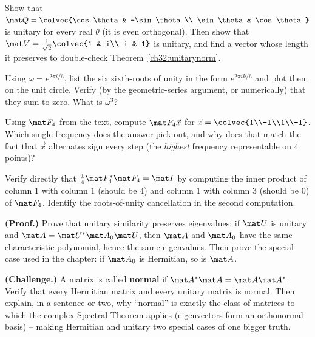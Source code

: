 \begin{exercise}\label{ch32:ex-unitarycheck}
Show that $\mat Q=\colvec{\cos\theta & -\sin\theta\\ \sin\theta & \cos\theta}$ is
unitary for every real $\theta$ (it is even orthogonal). Then show that
$\mat V=\tfrac1{\sqrt2}\colvec{1 & i\\ i & 1}$ is unitary, and find a vector whose
length it preserves to double-check Theorem~\ref{ch32:unitarynorm}.
\end{exercise}

\begin{exercise}\label{ch32:ex-rootsum}
Using $\omega=e^{2\pi i/6}$, list the six sixth-roots of unity in the form
$e^{2\pi ik/6}$ and plot them on the unit circle. Verify (by the geometric-series
argument, or numerically) that they sum to zero. What is $\omega^3$?
\end{exercise}

\begin{exercise}\label{ch32:ex-f4}
Using $\mat F_4$ from the text, compute $\mat F_4\vec x$ for
$\vec x=\colvec{1\\-1\\1\\-1}$. Which single frequency does the answer pick out, and
why does that match the fact that $\vec x$ alternates sign every step (the
\emph{highest} frequency representable on $4$ points)?
\end{exercise}

\begin{exercise}\label{ch32:ex-f4unitary}
Verify directly that $\tfrac14\mat F_4^{*}\mat F_4=\mat I$ by computing the inner
product of column $1$ with column $1$ (should be $4$) and column $1$ with column $3$
(should be $0$) of $\mat F_4$. Identify the roots-of-unity cancellation in the
second computation.
\end{exercise}

\begin{exercise}\label{ch32:ex-unitarysim}
\textbf{(Proof.)} Prove that unitary similarity preserves eigenvalues: if $\mat U$
is unitary and $\mat A=\mat U^{*}\mat A_0\mat U$, then $\mat A$ and $\mat A_0$ have
the same characteristic polynomial, hence the same eigenvalues. Then prove the
special case used in the chapter: if $\mat A_0$ is Hermitian, so is $\mat A$.
\end{exercise}

\begin{exercise}\label{ch32:ex-normalproof}
\textbf{(Challenge.)} A matrix is called \textbf{normal} if $\mat A^{*}\mat A=
\mat A\mat A^{*}$. Verify that every Hermitian matrix and every unitary matrix is
normal. Then explain, in a sentence or two, why ``normal'' is exactly the class of
matrices to which the complex Spectral Theorem applies (eigenvectors form an
orthonormal basis) -- making Hermitian and unitary two special cases of one bigger
truth.
\end{exercise}

